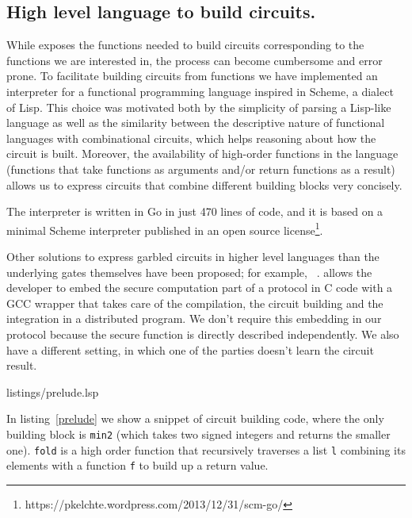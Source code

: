 \vspace{-8pt}
\subsection{High level language to build circuits.}

While \libgarble{} exposes the functions needed to build circuits corresponding
to the functions we are interested in, the process can become cumbersome and error
prone.  To facilitate building circuits from functions we have implemented an
interpreter for a functional programming language inspired in Scheme, a dialect
of Lisp.  This choice was motivated both by the simplicity of parsing a
Lisp-like language as well as the similarity between the descriptive nature of
functional languages with combinational circuits, which helps reasoning about
how the circuit is built.  Moreover, the availability of high-order functions
in the language (functions that take functions as arguments and/or return
functions as a result) allows us to express circuits that combine different
building blocks very concisely.

The interpreter is written in Go in just 470 lines of code, and it is based on
a minimal Scheme interpreter published in an open source
license\footnote{https://pkelchte.wordpress.com/2013/12/31/scm-go/}.

Other solutions to express garbled circuits in higher level languages than the
underlying gates themselves have been proposed; for example, \OblivC{}~\cite{oblivc}.
\OblivC{} allows the developer to embed the secure computation part of a
protocol in C code with a GCC wrapper that takes care of the compilation, the
circuit building and the integration in a distributed program.  We don't
require this embedding in our protocol because the secure function is directly
described independently.  We also have a different setting, in which one of the
parties doesn't learn the circuit result.

\smallskip
\noindent
\begin{minipage}{\linewidth}

{listings/prelude.lsp}
\end{minipage}

In listing~\ref{prelude} we show a snippet of circuit building code, where the
only \libgarble{} building block is \texttt{min2} (which takes two signed
integers and returns the smaller one).  \texttt{fold} is a high order function
that recursively traverses a list \texttt{l} combining its elements with a
function \texttt{f} to build up a return value.

